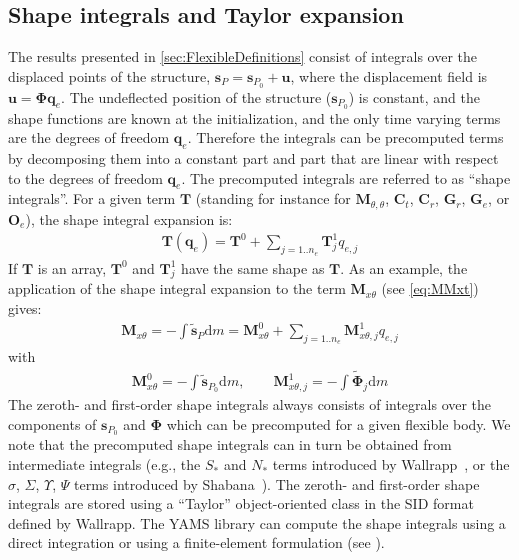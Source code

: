 \documentclass[wes, manuscript]{copernicus}
\renewcommand{\d}{\mathrm{d}}
\renewcommand{\v}[1]{\boldsymbol{#1}}
\newcommand{\m}[1]{\boldsymbol{#1}}
\newcommand{\s}{\v{s}}
\renewcommand{\d}{\mathrm{d}}
\newcommand{\dm}{\d{m}}
\begin{document}
\subsection{Shape integrals and Taylor expansion}
\label{sec:TaylorExpansionShapeIntegrals}
The results presented in \autoref{sec:FlexibleDefinitions} consist of integrals over the displaced points of the structure, $\v{s}_P=\s_{P_0} + \v{u}$, where the displacement field is $\v{u}=\m{\Phi} \v{q}_e$. The undeflected position of the structure ($\v{s}_{P_0}$) is constant, and the shape functions are known at the initialization, and the only time varying terms are the degrees of freedom $\v{q}_e$. Therefore the integrals can be precomputed terms by decomposing them into a constant part and part that are linear with respect to the degrees of freedom $\v{q}_e$. The precomputed integrals are referred to as ``shape integrals''. For a given term $\v{T}$ (standing for instance for $\m{M}_{\theta,\theta}$, $\m{C}_t$, $\m{C}_r$, $\v{G}_r$, $\v{G}_e$, or $\v{O}_e$), the shape integral expansion is:
\begin{align}
\m{T}(\v{q}_e) = \m{T}^0 
    + \sum\limits_{j=1..n_e} \m{T}^1_j q_{e,j}
    \label{eq:T01}
\end{align}
If $\m{T}$ is an array, $\m{T}^0$ and $\m{T}^1_j$ have the same shape as $\m{T}$.
As an example, the application of the shape integral expansion to the term $\m{M}_{x\theta}$ (see \autoref{eq:MMxt}) gives:
\begin{align}
   \m{M}_{x\theta}=-\int \tilde{\v{s}}_P \dm =  \m{M}_{x\theta}^0 +\sum\limits_{j=1..n_e}     {\m{M}_{x\theta,j}^1} q_{e,j}
\end{align}
with
\begin{align}
    \m{M}_{x\theta}^0 = -\int \tilde{\v{s}}_{P_0} \dm 
        ,\qquad
    \m{M}_{x\theta,j}^1 = -\int \tilde{\v{\Phi}}_j \dm 
\end{align}
The zeroth- and first-order shape integrals always consists of integrals over the components of $\s_{P_0}$ and $\m{\Phi}$ which can be precomputed for a given flexible body.
We note that the precomputed shape integrals can in turn be obtained from intermediate integrals (e.g., the $S_*$ and $N_*$ terms introduced by Wallrapp~\citep{Wallrapp:1994}, or the $\sigma$, $\Sigma$, $\Upsilon$, $\Psi$ terms introduced by Shabana~\citep{shabana:book}).  
The zeroth- and first-order shape integrals are stored using a ``Taylor'' object-oriented class in the SID format defined by Wallrapp. The YAMS library can compute the shape integrals using a direct integration or using a finite-element formulation (see \cite{Schwertassek:book}).
\end{document}

